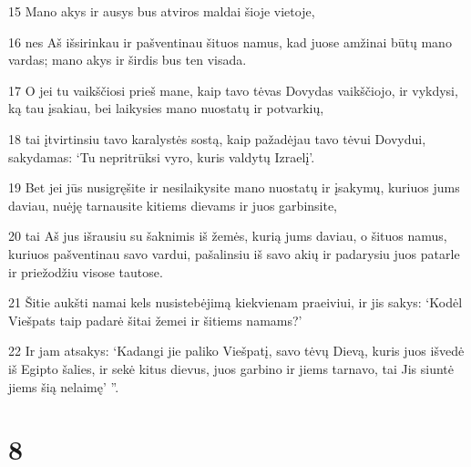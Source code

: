 \par 15 Mano akys ir ausys bus atviros maldai šioje vietoje, 
\par 16 nes Aš išsirinkau ir pašventinau šituos namus, kad juose amžinai būtų mano vardas; mano akys ir širdis bus ten visada. 
\par 17 O jei tu vaikščiosi prieš mane, kaip tavo tėvas Dovydas vaikščiojo, ir vykdysi, ką tau įsakiau, bei laikysies mano nuostatų ir potvarkių, 
\par 18 tai įtvirtinsiu tavo karalystės sostą, kaip pažadėjau tavo tėvui Dovydui, sakydamas: ‘Tu nepritrūksi vyro, kuris valdytų Izraelį’. 
\par 19 Bet jei jūs nusigręšite ir nesilaikysite mano nuostatų ir įsakymų, kuriuos jums daviau, nuėję tarnausite kitiems dievams ir juos garbinsite, 
\par 20 tai Aš jus išrausiu su šaknimis iš žemės, kurią jums daviau, o šituos namus, kuriuos pašventinau savo vardui, pašalinsiu iš savo akių ir padarysiu juos patarle ir priežodžiu visose tautose. 
\par 21 Šitie aukšti namai kels nusistebėjimą kiekvienam praeiviui, ir jis sakys: ‘Kodėl Viešpats taip padarė šitai žemei ir šitiems namams?’ 
\par 22 Ir jam atsakys: ‘Kadangi jie paliko Viešpatį, savo tėvų Dievą, kuris juos išvedė iš Egipto šalies, ir sekė kitus dievus, juos garbino ir jiems tarnavo, tai Jis siuntė jiems šią nelaimę’ ”.



\chapter{8}


